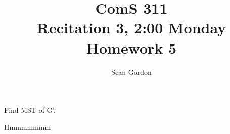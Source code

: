 \documentclass[12pt]{article}
\title{ComS 311\\Recitation 3, 2:00 Monday\\Homework 5}
\author{Sean Gordon}
\begin{document}
\maketitle


\begin{algorithm}[H]
\caption{Find MST of G'.}
\begin{algorithmic}
\State Hmmmmmmm
\end{algorithmic}
\end{algorithm}


\end{document}
